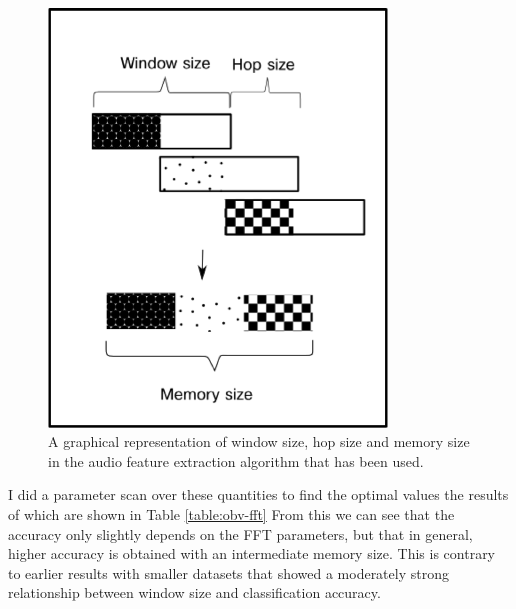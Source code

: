\documentclass[12pt,oneside]{book}
\begin{document}
\begin{figure}[h]
\centering
\includegraphics[width=90mm]{figures/dm_ws_hs_mem.png}
\caption{A graphical representation of window size, hop size and
  memory size in the audio feature extraction algorithm that has been
  used.}
\label{fig:dm_ws_hs_mem}
\end{figure}

I did a parameter scan over these quantities to find the optimal
values the results of which are shown in Table \ref{table:obv-fft}
From this we can see that the accuracy only slightly depends on the
FFT parameters, but that in general, higher accuracy is obtained with
an intermediate memory size.  This is contrary to earlier results
\cite{ness2011strategies} with smaller datasets that showed a
moderately strong relationship between window size and classification
accuracy.
\end{document}

